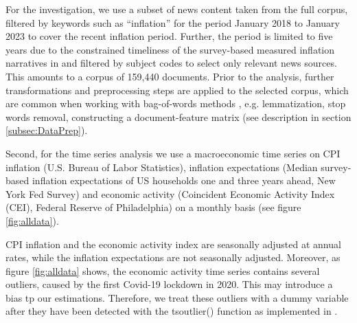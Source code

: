 For the investigation, we use a subset of news content taken from the full corpus, filtered by keywords such as ``inflation'' for the period January 2018 to January 2023 to cover the recent inflation period. Further, the period is limited to five years due to the constrained timeliness of the survey-based measured inflation narratives in \cite{Andre.2023} and filtered by subject codes to select only relevant news sources. This amounts to a corpus of 159,440 documents. Prior to the analysis, further transformations and preprocessing steps are applied to the selected corpus, which are common when working with bag-of-words methods \citep{grimmer.2022}, e.g. lemmatization, stop words removal, constructing a document-feature matrix (see description in section \ref{subsec:DataPrep}).

Second, for the time series analysis we use a macroeconomic time series on CPI inflation (U.S. Bureau of Labor Statistics), inflation expectations (Median survey-based inflation expectations of US households one and three years ahead, New York Fed Survey) and economic activity (Coincident Economic Activity Index (CEI), Federal Reserve of Philadelphia) on a monthly basis (see figure \ref{fig:alldata}). 

CPI inflation and the economic activity index are seasonally adjusted at annual rates, while the inflation expectations are not seasonally adjusted. Moreover, as figure \ref{fig:alldata} shows, the economic activity time series contains several outliers, caused by the first Covid-19 lockdown in 2020. This may introduce a bias tp our estimations. Therefore, we treat these outliers with a dummy variable after they have been detected with the \textsf{tsoutlier()} function as implemented in \cite{forecast.2022}.

%	
%	

